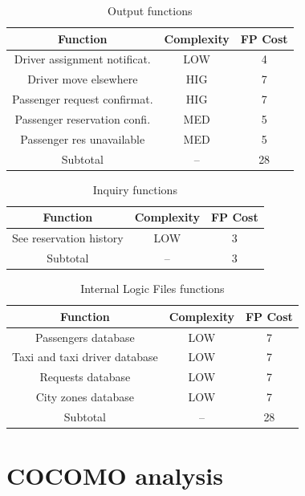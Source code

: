 
\begin{table}
\begin{center}
\begin{tabular}{ccc}
\toprule
Function								& Complexity	& FP Cost \\
\midrule
Driver assignment notificat.	&	LOW	&	4	\\
Driver move elsewhere			&	HIG	&	7	\\
Passenger request confirmat.	&	HIG	&	7	\\
Passenger reservation confi.	&	MED	&	5	\\
Passenger res unavailable		&	MED	&	5	\\
\midrule
Subtotal								&	--		&	28	\\
\bottomrule
\end{tabular}
\caption{Output functions}
\end{center}
\end{table}


\begin{table}
\begin{center}
\begin{tabular}{ccc}
\toprule
Function								& Complexity	& FP Cost \\
\midrule
See reservation history			&	LOW	&	3	\\
\midrule
Subtotal								&	--		&	3	\\
\bottomrule
\end{tabular}
\caption{Inquiry functions}
\end{center}
\end{table}


\begin{table}
\begin{center}
\begin{tabular}{ccc}
\toprule
Function									& Complexity	& FP Cost \\
\midrule
Passengers database					&	LOW	&	7	\\
Taxi and taxi driver database		&	LOW	&	7	\\
Requests database						&	LOW	&	7	\\
City zones database					&	LOW	&	7	\\
\midrule
Subtotal									&	--		&	28	\\
\bottomrule
\end{tabular}
\caption{Internal Logic Files functions}
\end{center}
\end{table}


\section{COCOMO analysis}


